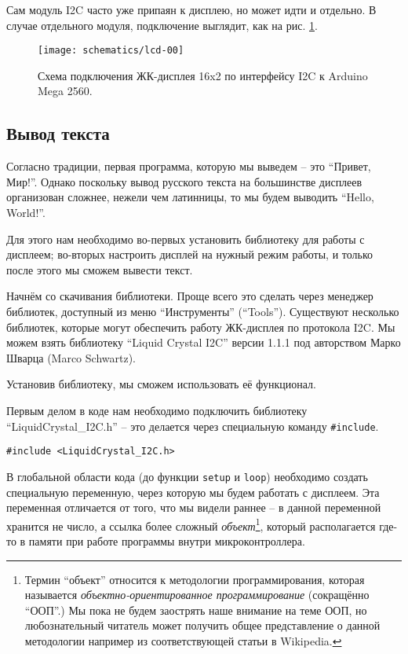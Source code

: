 \documentclass[../sparc.tex]{subfiles}
\begin{document}
Сам модуль I2C часто уже припаян к дисплею, но может идти и отдельно.  В случае
отдельного модуля, подключение выглядит, как на рис. \ref{fig:lcd-00}.

\begin{figure}[ht]
  \centering
  \texttt{[image: schematics/lcd-00]}
  \caption{Схема подключения ЖК-дисплея 16x2 по интерфейсу I2C к Arduino Mega
    2560.}
  \label{fig:lcd-00}
\end{figure}

\subsection{Вывод текста}

Согласно традиции, первая программа, которую мы выведем -- это ``Привет, Мир!''.
Однако поскольку вывод русского текста на большинстве дисплеев организован
сложнее, нежели чем латинницы, то мы будем выводить ``Hello, World!''.

Для этого нам необходимо во-первых установить библиотеку для работы с дисплеем;
во-вторых настроить дисплей на нужный режим работы, и только после этого мы
сможем вывести текст.

Начнём со скачивания библиотеки.  Проще всего это сделать через менеджер
библиотек, доступный из меню ``Инструменты'' (``Tools'').  Существуют несколько
библиотек, которые могут обеспечить работу ЖК-дисплея по протокола I2C.  Мы
можем взять библиотеку ``Liquid Crystal I2C'' версии 1.1.1 под авторством Марко
Шварца (Marco Schwartz).

Установив библиотеку, мы сможем использовать её функционал.

Первым делом в коде нам необходимо подключить библиотеку
``LiquidCrystal\_I2C.h'' -- это делается через специальную команду
\texttt{\#include}.

\begin{verbatim}
#include <LiquidCrystal_I2C.h>
\end{verbatim}

В глобальной области кода (до функции \texttt{setup} и \texttt{loop}) необходимо
создать специальную переменную, через которую мы будем работать с дисплеем. Эта
переменная отличается от того, что мы видели раннее -- в данной переменной
хранится не число, а ссылка более сложный \emph{объект}\footnote{Термин
``объект'' относится к методологии программирования, которая называется
\emph{объектно-ориентированное программирование} (сокращённо ``ООП''.)  Мы пока
не будем заострять наше внимание на теме ООП, но любознательный читатель может
получить общее представление о данной методологии например из соответствующей
статьи в Wikipedia.}, который располагается где-то в памяти при работе программы
внутри микроконтроллера.
\end{document}
